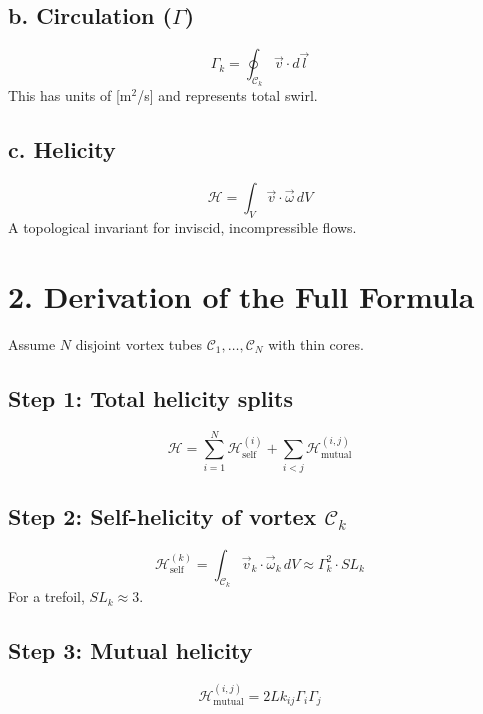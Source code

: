 \subsection*{b. Circulation ($\Gamma$)}
\begin{equation}
    \Gamma_k = \oint_{\mathcal{C}_k} \vec{v} \cdot d\vec{l}
\end{equation}
This has units of [m$^2$/s] and represents total swirl.

\subsection*{c. Helicity}
\begin{equation}
    \mathcal{H} = \int_V \vec{v} \cdot \vec{\omega} \, dV
\end{equation}
A topological invariant for inviscid, incompressible flows.

\section*{2. Derivation of the Full Formula}
Assume $N$ disjoint vortex tubes $\mathcal{C}_1, \dots, \mathcal{C}_N$ with thin cores.

\subsection*{Step 1: Total helicity splits}
\begin{equation}
    \mathcal{H} = \sum_{i=1}^N \mathcal{H}_{\text{self}}^{(i)} + \sum_{i < j} \mathcal{H}_{\text{mutual}}^{(i,j)}
\end{equation}

\subsection*{Step 2: Self-helicity of vortex $\mathcal{C}_k$}
\begin{equation}
    \mathcal{H}_{\text{self}}^{(k)} = \int_{\mathcal{C}_k} \vec{v}_k \cdot \vec{\omega}_k \, dV \approx \Gamma_k^2 \cdot SL_k
\end{equation}
For a trefoil, $SL_k \approx 3$.

\subsection*{Step 3: Mutual helicity}
\begin{equation}
    \mathcal{H}_{\text{mutual}}^{(i,j)} = 2 Lk_{ij} \Gamma_i \Gamma_j
\end{equation}

